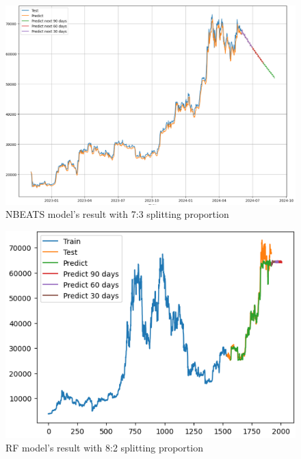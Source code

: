\documentclass{ieeeojies}
\begin{document}
\begin{figure}[H]
	\centering
	\begin{minipage}{0.8\linewidth}
		\centering
		\includegraphics[width=\linewidth]{bibliography/Images/NBEATS_BTC_73.PNG}
		\caption{NBEATS model's result with 7:3 splitting proportion}
	\end{minipage}
\end{figure}
\begin{figure}[H]
	\centering
	\begin{minipage}{0.8\linewidth}
		\centering
		\includegraphics[width=\linewidth]{bibliography/Images/RF_BTC_82.PNG}
		\caption{RF model's result with 8:2 splitting proportion}
	\end{minipage}
\end{figure}
\EOD
\end{document}
